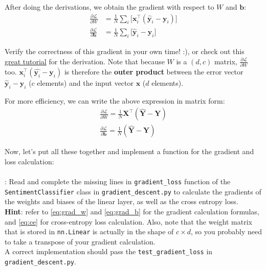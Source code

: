 After doing the derivations, we obtain the gradient with respect to $W$ and $\mathbf{b}$:
\begin{align}
     \frac{\partial \mathcal{L} }{\partial W} &= \frac{1}{N} \sum_{i} \big[ \mathbf{x}_i^\top (\hat{\mathbf{y}}_i - \mathbf{y}_i) \big]\\
     \frac{\partial \mathcal{L} }{\partial \mathbf{b}} &= \frac{1}{N} \sum_{i} \big[ \hat{\mathbf{y}}_i - \mathbf{y}_i \big]
\end{align}

Verify the correctness of this gradient in your own time! :), or check out this \href{https://jmlb.github.io/ml/2017/12/26/Calculate_Gradient_Softmax/}{great tutorial} for the derivation. Note that because $W$ is a $(d, c)$ matrix, $\frac{\partial \mathcal{L} }{\partial W}$ too. $\mathbf{x}_i^\top(\hat{\mathbf{y}_i} - \mathbf{y}_i)$ is therefore the \textbf{outer product} between the error vector $\hat{\mathbf{y}}_i - \mathbf{y}_i$ ($c$ elements) and the input vector $\mathbf{x}$ ($d$ elements).

For more efficiency, we can write the above expression in matrix form:
\begin{align}
    \frac{\partial \mathcal{L} }{\partial W} = \frac{1}{N}  \mathbf{X}^\top (\hat{\mathbf{Y}} -\mathbf{Y})\label{eq:grad_w} \\
    \frac{\partial \mathcal{L} }{\partial \mathbf{b}} = \frac{1}{N}  (\hat{\mathbf{Y}} -\mathbf{Y})\label{eq:grad_b}
\end{align}
  
Now, let's put all these together and implement a function for the gradient and loss calculation:\\\\
\noindent \todo{}: Read and complete the missing lines in \texttt{gradient\_loss} function of the \texttt{SentimentClassifier} class in \texttt{gradient\_descent.py} to calculate the gradients of the weights and biases of the linear layer, as well as the cross entropy loss.
\\
\noindent \textbf{Hint}: refer to \autoref{eq:grad_w} and \autoref{eq:grad_b} for the gradient calculation formulas, and \autoref{eq:ce} for cross-entropy loss calculation. Also, note that the weight matrix that is stored in \texttt{nn.Linear} is actually in the shape of $c \times d$, so you probably need to take a transpose of your gradient calculation.
\\
A correct implementation should pass the \texttt{test\_gradient\_loss} in \texttt{gradient\_descent.py}.

